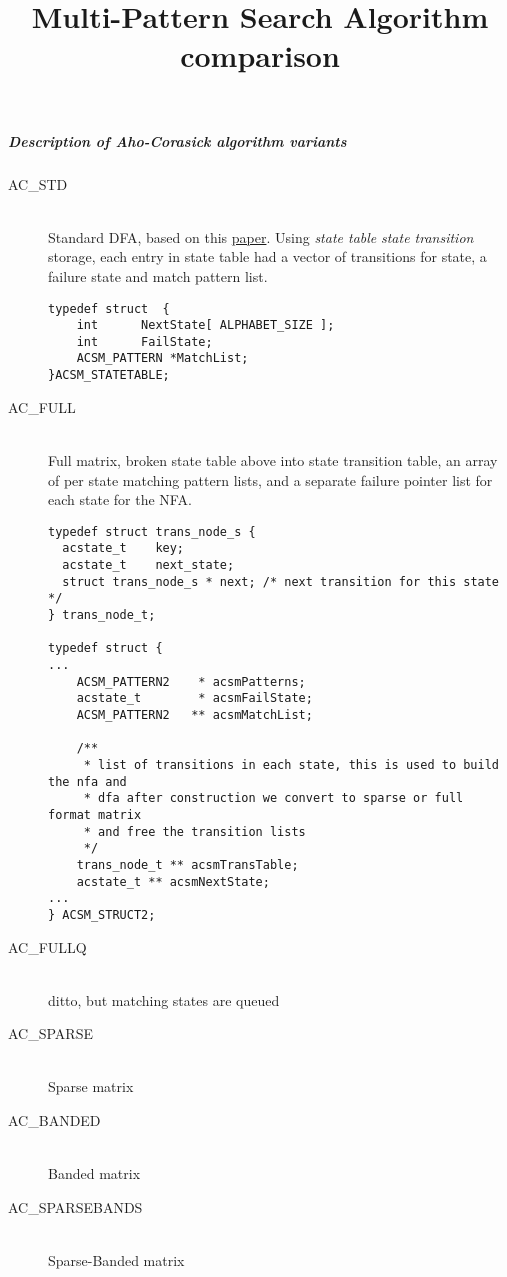 \documentclass{article}
\begin{document}
\title{Multi-Pattern Search Algorithm comparison}
\author{}
\maketitle


\subparagraph{Description of Aho-Corasick algorithm variants}


\begin{description}
\item[AC\_STD] \hfill \\
  Standard DFA, based on this \hyperlink{effic}{paper}. Using \textit{state table}  \textit{state transition} storage, each entry in state table had a vector of transitions for state, a failure state  and match pattern list.
\begin{lstlisting}
typedef struct  {
    int      NextState[ ALPHABET_SIZE ];
    int      FailState;
    ACSM_PATTERN *MatchList;
}ACSM_STATETABLE;
\end{lstlisting}
\item[AC\_FULL] \hfill \\
  Full matrix, broken state table above into state transition table, an array of per state matching pattern lists, and a separate failure pointer list for each state for the NFA.
\begin{lstlisting}
typedef struct trans_node_s {
  acstate_t    key;
  acstate_t    next_state;
  struct trans_node_s * next; /* next transition for this state */
} trans_node_t;

typedef struct {
...
    ACSM_PATTERN2    * acsmPatterns;
    acstate_t        * acsmFailState;
    ACSM_PATTERN2   ** acsmMatchList;

    /**
     * list of transitions in each state, this is used to build the nfa and
     * dfa after construction we convert to sparse or full format matrix
     * and free the transition lists
     */
    trans_node_t ** acsmTransTable;
    acstate_t ** acsmNextState;
...
} ACSM_STRUCT2;
\end{lstlisting}
\item[AC\_FULLQ] \hfill \\
  ditto, but matching states are queued
\item[AC\_SPARSE] \hfill \\
  Sparse matrix
\item[AC\_BANDED] \hfill \\
  Banded matrix
\item[AC\_SPARSEBANDS] \hfill \\
  Sparse-Banded matrix
\end{description}
\end{document}
